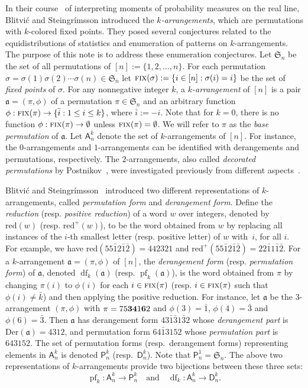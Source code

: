 \documentclass[12pt]{amsart} %
\numberwithin{equation}{section}
\theoremstyle{plain}
\theoremstyle{definition}
\newcommand\A{\mathsf{A}}
\renewcommand\P{\mathsf{P}}
\newcommand\D{\mathsf{D}}
\def\reduction{\mathrm{red}}
\def\Der{\mathrm{Der}}
\def\Fix{\hbox{\rm\textsc{fix}}}
\def\S{\mathfrak{S}}
\def\a{\mathfrak{a}}
\def\df{\operatorname{df}}
\def\pf{\operatorname{pf}}
\def\neg#1{{{{\bar#1}}}}
\begin{document}
In their course~\cite{bs} of interpreting moments of probability measures on the real line, Blitvi\'c and Steingr\'imsson introduced the {\em$k$-arrangements}, which are permutations with $k$-colored fixed points. They posed several  conjectures related to the equidistributions of statistics and enumeration of patterns on $k$-arrangements. The purpose of this note is to address these enumeration conjectures.
%
Let $\S_n$ be the set of all permutations of $[n]:=\{1,2,\ldots,n\}$. 
For each permutation 
$\sigma=\sigma(1)\sigma(2)\cdots\sigma(n) \in\S_n$ 
let $\Fix(\sigma):=\{i\in[n]:\sigma(i)=i\}$ 
be the set of {\em fixed points} of $\sigma$. 
For any nonnegative integer $k$, a {\em$k$-arrangement} of $[n]$ is a 
pair $\mathfrak{a}=(\pi,\phi)$ of a permutation $\pi\in\S_n$ 
and an arbitrary function
$\phi:\Fix(\pi)\rightarrow\{\neg i: 1\leq i\leq k\}$, 
where $\neg i:=-i$. Note that for $k=0$,  there is no function $\phi:\Fix(\pi)\rightarrow\emptyset$ unless $\Fix(\pi)=\emptyset$.  We will refer to $\pi$ as the {\em base permutation} of $\a$. Let $\A_n^k$ denote the set of $k$-arrangements of $[n]$.  
For instance, the $0$-arrangements and $1$-arrangements can be identified with derangements and permutations, respectively. 
The $2$-arrangements, also called  {\it decorated permutations} by Postnikov~\cite[Def.~13.3]{po}, were investigated previously from different aspects~\cite{cor,lwz,po,wi}.  


Blitvi\'c and Steingr\'imsson~\cite{bs} introduced two different representations of $k$-arrangements, called {\em permutation form} and {\em derangement form}. 
Define the {\em reduction} (resp. {\em positive reduction})  of a word $w$ over integers, denoted by $\reduction(w)$ (resp. $\reduction^+(w)$),  to be the word obtained from $w$ by replacing all instances of 
the $i$-th smallest letter (resp. positive letter) of $w$ with~$i$, for all $i$. For example, we have $\reduction(55\neg12\neg1\neg2)=442321$
and $\reduction^+(55\neg12\neg1\neg2)=22\neg11\neg1\neg2$.
For a $k$-arrangement $\a=(\pi,\phi)$ of $[n]$, the {\em derangement form} (resp. {\em permutation form}) of $\a$, denoted $\df_k(\a)$ (resp. $\pf_k(\a)$),  is the word obtained from $\pi$ by changing $\pi(i)$ to $\phi(i)$ 
for each $i\in\Fix(\pi)$  (resp. $i\in\Fix(\pi)$ such that $\phi(i)\neq \neg k$) and then applying the positive reduction. 
For instance,  let $\a$ be the $3$-arrangement $(\pi, \phi)$ with $\pi=75{\bf3}{\bf4}1{\bf6}2$ and $\phi(3)=\neg 1$, $\phi(4)=\neg 3$ and $\phi(6)=\neg 3$. 
Then $\a$ has derangement form $43\neg1\neg31\neg32$ whose {\em derangement part} is $\Der(\a)=4312$, and 
permutation form $64\neg13152$ whose {\em permutation part} is $643152$. 
The set of permutation forms (resp.~derangement forms) representing elements in $\A_n^k$ is denoted $\P_n^k$ (resp.~$\D_n^k$). Note that $\P_n^1=\S_n$.
The above two representations of $k$-arrangements provide	
two bijections between these three sets:
	$$\pf_k: \A_n^k\rightarrow \P_n^k \quad \text{and} \quad \df_k: \A_n^k\rightarrow \D_n^k.$$
%
\end{document}
